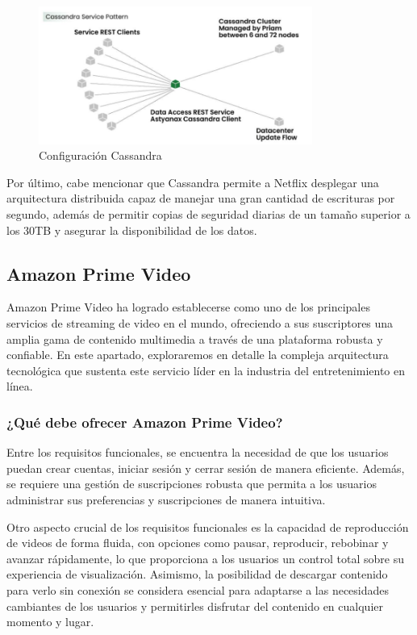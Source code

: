 \documentclass[12pt,a4paper]{article}
\begin{document}
    \begin{figure}[H]
        \centering
        \includegraphics[width=0.8\textwidth]{./img/cassandra_netflix.png}
        \caption{Configuración Cassandra}
        \label{fig:netflix_cassandra}
    \end{figure}

    Por último, cabe mencionar que Cassandra permite a Netflix desplegar una arquitectura distribuida capaz de manejar una gran cantidad de escrituras por segundo, además de permitir copias de seguridad diarias de un tamaño superior a los 30TB y asegurar la disponibilidad de los datos.

    \newpage

    \subsection{Amazon Prime Video}
    Amazon Prime Video ha logrado establecerse como uno de los principales servicios de streaming de video en el mundo, ofreciendo a sus suscriptores una amplia gama de contenido multimedia a través de una plataforma robusta y confiable. En este apartado, exploraremos en detalle la compleja arquitectura tecnológica que sustenta este servicio líder en la industria del entretenimiento en línea.

    \subsubsection{¿Qué debe ofrecer Amazon Prime Video?}

    Entre los requisitos funcionales, se encuentra la necesidad de que los usuarios puedan crear cuentas, iniciar sesión y cerrar sesión de manera eficiente. Además, se requiere una gestión de suscripciones robusta que permita a los usuarios administrar sus preferencias y suscripciones de manera intuitiva.

    Otro aspecto crucial de los requisitos funcionales es la capacidad de reproducción de videos de forma fluida, con opciones como pausar, reproducir, rebobinar y avanzar rápidamente, lo que proporciona a los usuarios un control total sobre su experiencia de visualización. Asimismo, la posibilidad de descargar contenido para verlo sin conexión se considera esencial para adaptarse a las necesidades cambiantes de los usuarios y permitirles disfrutar del contenido en cualquier momento y lugar. \cite{dave2023}
\end{document}
